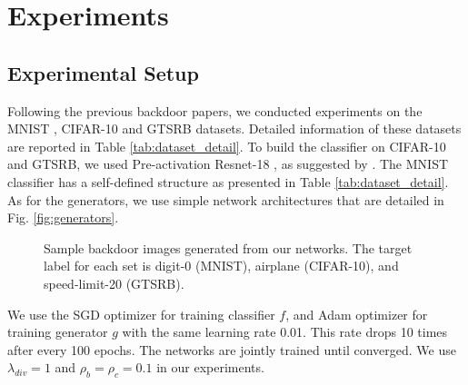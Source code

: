 \section{Experiments}
\subsection{Experimental Setup}
Following the previous backdoor papers, we conducted experiments on the MNIST \cite{lecun1998gradient}, CIFAR-10 \cite{krizhevsky2009learning} and GTSRB \cite{stallkamp2012man} datasets. Detailed information of these datasets are reported in Table \ref{tab:dataset_detail}. To build the classifier on CIFAR-10 and GTSRB, we used Pre-activation Resnet-18 \cite{he2016identity}, as suggested by \cite{kuangliu2020May}. The MNIST classifier has a self-defined structure as presented in Table \ref{tab:dataset_detail}. As for the generators, we use simple network architectures that are detailed in Fig. \ref{fig:generators}.

\begin{figure}[t]
\vskip 0.05in
\centering
{}
\hspace{2mm}
\hspace{2mm}

\caption{Sample backdoor images generated from our networks. The target label for each set is digit-0 (MNIST), airplane (CIFAR-10), and speed-limit-20 (GTSRB).}
\vspace{-4mm}
\label{fig:bdimages}
\end{figure}

We use the SGD optimizer for training classifier $f$, and Adam optimizer for training generator $g$ with the same learning rate 0.01. This rate drops 10 times after every 100 epochs. The networks are jointly trained until converged. We use $\lambda_{div} = 1$ and $\rho_b = \rho_c = 0.1$ in our experiments. 

